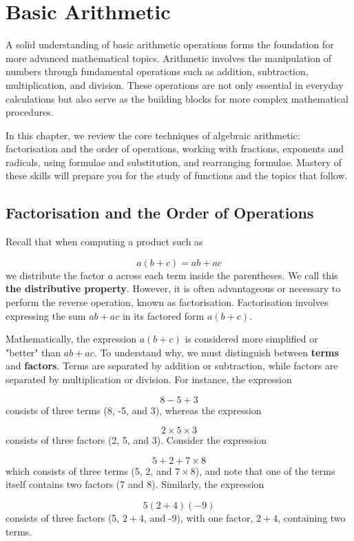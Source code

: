 \chapter{Basic Arithmetic}
\label{chap:ch0}
A solid understanding of basic arithmetic operations forms the foundation for more advanced mathematical topics. Arithmetic involves the manipulation of numbers through fundamental operations such as addition, subtraction, multiplication, and division. These operations are not only essential in everyday calculations but also serve as the building blocks for more complex mathematical procedures.

In this chapter, we review the core techniques of algebraic arithmetic: factorisation and the order of operations, working with fractions, exponents and radicals, using formulae and substitution, and rearranging formulae. Mastery of these skills will prepare you for the study of functions and the topics that follow.

\section{Factorisation and the Order of Operations}
Recall that when computing a product such as

\[
a(b + c) = ab + ac
\]
we distribute the factor \(a\) across each term inside the parentheses. We call this \textbf{the distributive property}. However, it is often advantageous or necessary to perform the reverse operation, known as factorisation. Factorisation involves expressing the sum \(ab + ac\) in its factored form \(a(b + c)\).

Mathematically, the expression \(a(b + c)\) is considered more simplified or "better" than \(ab + ac\). To understand why, we must distinguish between \textbf{terms} and \textbf{factors}. Terms are separated by addition or subtraction, while factors are separated by multiplication or division. For instance, the expression 

\[ 
8 - 5 + 3 
\]
consists of three terms (8, -5, and 3), whereas the expression 

\[ 
2 \times 5 \times 3 
\]
consists of three factors (2, 5, and 3). Consider the expression 

\[ 
5 + 2 + 7 \times 8 
\]
which consists of three terms (5, 2, and \(7 \times 8\)), and note that one of the terms itself contains two factors (7 and 8). Similarly, the expression 

\[ 
5(2 + 4)(-9) 
\]
consists of three factors (5, \(2 + 4\), and -9), with one factor, \(2 + 4\), containing two terms.

